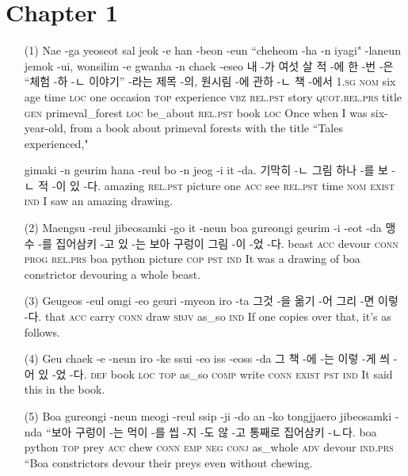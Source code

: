 \section*{Chapter 1}

\begin{itemize}
\item [(1)]
\tgl
		{Nae -ga yeoseot sal jeok -e han -beon -eun ``cheheom -ha -n iyagi" -laneun jemok -ui, wonsilim -e gwanha -n chaek -eseo}
		{내 -가 여섯 살 적 -에 한 -번 -은 ``체험 -하 -ㄴ 이야기” -라는 제목 -의, 원시림 -에 관하 -ㄴ 책 -에서}
		{\textsc{1.sg} \textsc{nom} six age time \textsc{loc} one occasion \textsc{top}	experience \textsc{vbz} \textsc{rel.pst} story \textsc{quot.rel.prs} title \textsc{gen} primeval\_forest \textsc{loc} be\_about \textsc{rel.pst} book \textsc{loc}}
		{Once when I was six-year-old, from a book about primeval forests with the title ``Tales experienced,"}
		
\tgl
		{gimaki -n geurim hana -reul bo -n jeog -i it -da.}
		{기막히 -ㄴ 그림 하나 -를 보 -ㄴ 적 -이 있 -다.}
		{amazing \textsc{rel.pst} picture one \textsc{acc} see \textsc{rel.pst} time \textsc{nom} \textsc{exist} \textsc{ind}}
		{I saw an amazing drawing.}

\item [(2)]
\tgl
		{Maengsu -reul jibeosamki -go it -neun boa gureongi geurim -i -eot -da}
		{맹수 -를 집어삼키 -고 있 -는 보아 구렁이 그림 -이 -었 -다.}
		{beast \textsc{acc} devour \textsc{conn} \textsc{prog} \textsc{rel.prs} boa python picture \textsc{cop} \textsc{pst} \textsc{ind}}
		{It was a drawing of boa constrictor devouring a whole beast.}

\item [(3)]
\tgl
		{Geugeos -eul omgi -eo geuri -myeon iro -ta}
		{그것 -을 옮기 -어 그리 -면 이렇 -다.}
		{that \textsc{acc} carry \textsc{conn} draw \textsc{sbjv} as\_so \textsc{ind}}
		{If one copies over that, it's as follows.}

\item [(4)]
\tgl
		{Geu chaek -e -neun iro -ke ssui -eo iss -eoss -da}
		{그 책 -에 -는 이렇 -게 씌 -어 있 -었 -다.}
		{\textsc{def} book \textsc{loc} \textsc{top} as\_so \textsc{comp} write \textsc{conn} \textsc{exist} \textsc{pst} \textsc{ind}}
		{It said this in the book.}

\item [(5)]
\tgl
		{Boa gureongi -neun meogi -reul ssip -ji -do an -ko tongjjaero jibeosamki -nda}
		{``보아 구렁이 -는 먹이 -를 씹 -지 -도 않 -고 통째로 집어삼키 -ㄴ다.}
		{boa python \textsc{top} prey \textsc{acc} chew \textsc{conn} \textsc{emp} \textsc{neg} \textsc{conj} as\_whole \textsc{adv} devour \textsc{ind.prs}}
		{``Boa constrictors devour their preys even without chewing.}


\end{itemize}
